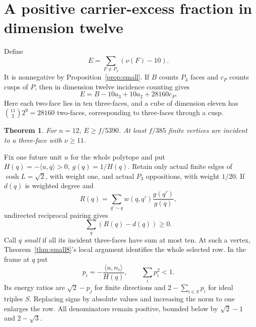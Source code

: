 \documentclass[11pt]{article}
\newtheorem{theorem}{Theorem}[section]
\theoremstyle{definition}\newtheorem{definition}[theorem]{Definition}
\theoremstyle{remark}\newtheorem{remark}[theorem]{Remark}
\newcommand{\ip}[2]{\langle #1,#2\rangle}
\newcommand{\nuu}{\nu}
\newcommand{\Pthree}{P_3}
\newcommand{\bin}[2]{\binom{#1}{#2}}
\begin{document}
\section{A positive carrier-excess fraction in dimension twelve}
Define
\begin{equation}\label{eq:E}
 E=\sum_{F\ne\Pthree}(\nuu(F)-10).
\end{equation}
It is nonnegative by Proposition~\ref{prop:small}. If \(B\) counts
\(\Pthree\) faces and \(c_P\) counts cusps of \(P\), then in dimension
twelve incidence counting gives
\[
 E=B-10a_3+10a_2+28160c_P.
\]
Here each two-face lies in ten three-faces, and a cube of dimension
eleven has \(\bin{11}{2}2^9=28160\) two-faces, corresponding to
three-faces through a cusp.

\begin{theorem}\label{thm:fraction}
For \(n=12\), \(E\ge f/5390\). At least \(f/385\) finite vertices
are incident to a three-face with \(\nuu\ge11\).
\end{theorem}

Fix one future unit \(u\) for the whole polytope and put
\(H(q)=-\ip{u}{q}>0,\ g(q)=1/H(q)\).
Retain only actual finite edges of \(\cosh L=\sqrt2\), with weight
one, and actual \(\Pthree\) oppositions, with weight \(1/20\).
If \(d(q)\) is weighted degree and
\[
 R(q)=\sum_{q'\sim q}w(q,q')\frac{g(q')}{g(q)},
\]
undirected reciprocal pairing gives
\begin{equation}\label{eq:Schur}
 \sum_q(R(q)-d(q))\ge0.
\end{equation}
Call \(q\) \emph{small} if all its incident three-faces have sum at
most ten. At such a vertex, Theorem~\ref{thm:small8}'s local argument
identifies the whole selected row. In the frame at \(q\) put
\[
 p_i=-\frac{\ip{u}{n_i}}{H(q)},\qquad \sum_i p_i^2<1.
\]
Its energy ratios are \(\sqrt2-p_j\) for finite directions and
\(2-\sum_{i\in S}p_i\) for ideal triples \(S\). Replacing signs
by absolute values and increasing the norm to one enlarges the row.
All denominators remain positive, bounded below by
\(\sqrt2-1\) and \(2-\sqrt3\).
\end{document}
